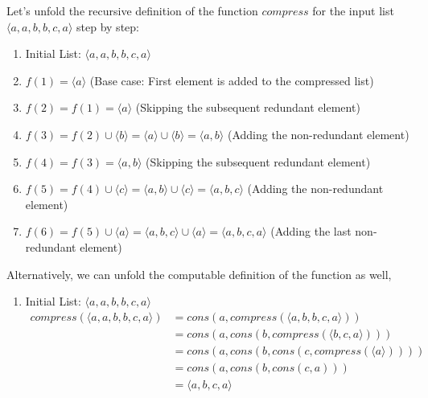 \documentclass[12pt]{article}
\begin{document}
\begin{spacing}{1.5}
\begin{enumerate}
		      Let's unfold the recursive definition of the function $compress$ for the input list $\langle a, a, b, b, c, a \rangle$ step by step:
		      		      
		      \begin{enumerate}
		      	\item Initial List: $\langle a, a, b, b, c, a \rangle$
		      	      		      	      
		      	\item $f(1) = \langle a \rangle$ (Base case: First element is added to the compressed list)
		      	      		      	      
		      	\item $f(2) = f(1) = \langle a \rangle$ (Skipping the subsequent redundant element)
		      	      		      	      
		      	\item $f(3) = f(2) \cup \langle b \rangle = \langle a \rangle \cup \langle b \rangle = \langle a, b \rangle$ (Adding the non-redundant element)
		      	      		      	      
		      	\item $f(4) = f(3) = \langle a, b \rangle$ (Skipping the subsequent redundant element)
		      	      		      	      
		      	\item $f(5) = f(4) \cup \langle c \rangle = \langle a, b \rangle \cup \langle c \rangle = \langle a, b, c \rangle$ (Adding the non-redundant element)
		      	      		      	      
		      	\item $f(6) = f(5) \cup \langle a \rangle = \langle a, b, c \rangle \cup \langle a \rangle = \langle a, b, c, a \rangle$ (Adding the last non-redundant element)\\
		      \end{enumerate}
		      
		      Alternatively, we can unfold the computable definition of the function as well,
		      
		      \begin{enumerate}
		      	\item Initial List: $\langle a, a, b, b, c, a \rangle$
		      	      \begin{align*}
		      	      	compress(\langle a, a, b, b, c, a \rangle) & = cons(a, compress(\langle a, b, b, c, a \rangle))       \\
                           & = cons(a, cons(b, compress(\langle b, c, a \rangle)))    \\
                           & = cons(a, cons(b, cons(c, compress(\langle a \rangle)))) \\
                           & = cons(a, cons(b, cons(c, a)))                           \\
                           & = \langle a, b, c, a \rangle                             
		      	      \end{align*}
		      	                      

\end{enumerate}
\end{enumerate}
\end{spacing}
\end{document}
